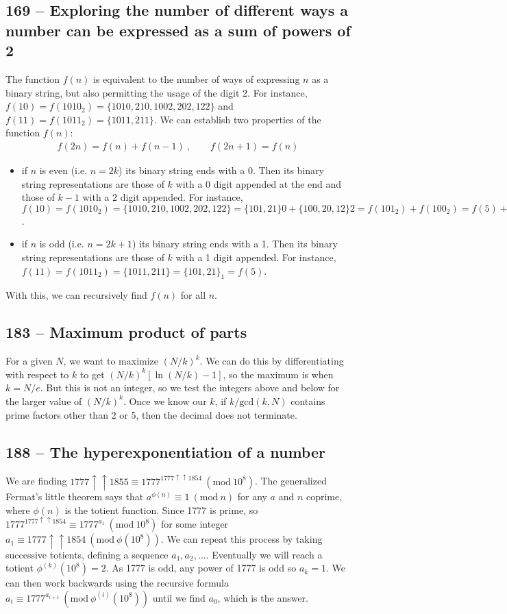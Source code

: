 \documentclass{article}
\newcommand{\Mod}[1]{\ (\mathrm{mod}\ #1)}
\begin{document}
\subsection*{169 -- Exploring the number of different ways a number can be expressed as a sum of powers of 2} 
The function $f(n)$ is equivalent to the number of ways of expressing $n$ as a binary string, but also permitting the usage of the digit 2. 
For instance, $f(10) = f(1010_2) = \{1010, 210, 1002, 202, 122\}$ and $f(11) = f(1011_2) = \{1011, 211\}$. 
We can establish two properties of the function $f(n)$:
\begin{align*}
	f(2n) = f(n) + f(n-1)~, \qquad f(2n+1) = f(n)
\end{align*}
\begin{itemize}
\item if $n$ is even (i.e. $n = 2k$) its binary string ends with a 0. Then its binary string representations are those of $k$ with a 0 digit appended at the end and those of $k-1$ with a 2 digit appended. For instance, $f(10) = f(1010_2) = \{1010, 210, 1002, 202, 122\} = \{101, 21\}0 + \{100, 20, 12\}2 = f(101_2) + f(100_2) = f(5) + f(4)$.
\item if $n$ is odd (i.e. $n = 2k+1$) its binary string ends with a 1. Then its binary string representations are those of $k$ with a 1 digit appended. For instance, $f(11) = f(1011_2) = \{1011, 211\} = \{101, 21\}_1 = f(5)$.
\end{itemize}
With this, we can recursively find $f(n)$ for all $n$.

\subsection*{183 -- Maximum product of parts} 
For a given $N$, we want to maximize $(N/k)^k$. 
We can do this by differentiating with respect to $k$ to get $(N/k)^k[\ln(N/k) - 1]$, so the maximum is when $k = N/e$. 
But this is not an integer, so we test the integers above and below for the larger value of $(N/k)^k$. 
Once we know our $k$, if $k/\text{gcd}(k, N)$ contains prime factors other than 2 or 5, then the decimal does not terminate.

\subsection*{188 -- The hyperexponentiation of a number} 
We are finding $1777\uparrow\uparrow1855 \equiv 1777^{1777\uparrow\uparrow1854} \Mod{10^8}$.
The generalized Fermat's little theorem says that $a^{\phi(n)} \equiv 1 \Mod{n}$ for any $a$ and $n$ coprime, where $\phi(n)$ is the totient function. 
Since 1777 is prime, so $1777^{1777\uparrow\uparrow1854} \equiv 1777^{a_1} \Mod {10^8}$ for some integer $a_1 \equiv 1777\uparrow\uparrow1854 \Mod{\phi(10^8)}$. 
We can repeat this process by taking successive totients, defining a sequence $a_1, a_2, \dotsc$. 
Eventually we will reach a totient $\phi^{(k)}(10^8) = 2$. 
As 1777 is odd, any power of 1777 is odd so $a_k = 1$. 
We can then work backwards using the recursive formula $a_{i} \equiv 1777^{a_{i+1}} \Mod{\phi^{(i)}(10^8)}$ until we find $a_0$, which is the answer.
\end{document}

